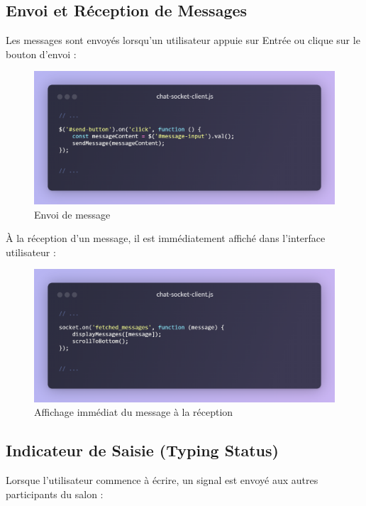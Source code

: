 \subsection*{Envoi et Réception de Messages}

Les messages sont envoyés lorsqu’un utilisateur appuie sur Entrée ou clique sur le bouton d'envoi :

\begin{figure}[H]
    \centering
    \includegraphics[width=15cm]{assets/annexes/snippet (16).png}
    \caption{ Envoi de message}
\end{figure}

À la réception d’un message, il est immédiatement affiché dans l’interface utilisateur :

\begin{figure}[H]
    \centering
    \includegraphics[width=15cm]{assets/annexes/snippet (17).png}
    \caption{ Affichage immédiat du message à la réception}
\end{figure}

\subsection*{Indicateur de Saisie (Typing Status)}

Lorsque l’utilisateur commence à écrire, un signal est envoyé aux autres participants du salon :

